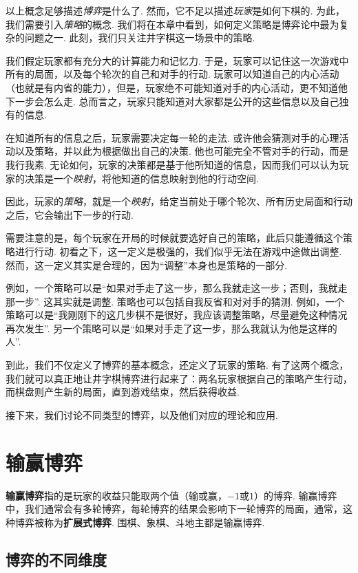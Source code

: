 以上概念足够描述\textit{博弈}是什么了. 然而，它不足以描述\textit{玩家}是如何下棋的. 为此，我们需要引入\textit{策略}的概念. 我们将在本章中看到，如何定义策略是博弈论中最为复杂的问题之一. 此刻，我们只关注井字棋这一场景中的策略.

我们假定玩家都有充分大的计算能力和记忆力. 于是，玩家可以记住这一次游戏中所有的局面，以及每个轮次的自己和对手的行动. 玩家可以知道自己的内心活动（也就是有内省的能力），但是，玩家绝不可能知道对手的内心活动，更不知道他下一步会怎么走. 总而言之，玩家只能知道对大家都是公开的这些信息以及自己独有的信息. 

在知道所有的信息之后，玩家需要决定每一轮的走法. 或许他会猜测对手的心理活动以及策略，并以此为根据做出自己的决策. 他也可能完全不管对手的行动，而是我行我素. 无论如何，玩家的决策都是基于他所知道的信息，因而我们可以认为玩家的决策是一个\textit{映射}，将他知道的信息映射到他的行动空间. 

因此，玩家的\textit{策略}，就是一个\textit{映射}，给定当前处于哪个轮次、所有历史局面和行动之后，它会输出下一步的行动. 

需要注意的是，每个玩家在开局的时候就要选好自己的策略，此后只能遵循这个策略进行行动. 初看之下，这一定义是极强的，我们似乎无法在游戏中途做出调整. 然而，这一定义其实是合理的，因为“调整”本身也是策略的一部分. 

例如，一个策略可以是“如果对手走了这一步，那么我就走这一步；否则，我就走那一步”. 这其实就是调整. 策略也可以包括自我反省和对对手的猜测. 例如，一个策略可以是“我刚刚下的这几步棋不是很好，我应该调整策略，尽量避免这种情况再次发生”. 另一个策略可以是“如果对手走了这一步，那么我就认为他是这样的人”.

到此，我们不仅定义了博弈的基本概念，还定义了玩家的策略. 有了这两个概念，我们就可以真正地让井字棋博弈进行起来了：两名玩家根据自己的策略产生行动，而棋盘则产生新的局面，直到游戏结束，然后获得收益. 

接下来，我们讨论不同类型的博弈，以及他们对应的理论和应用. 

\section{输赢博弈}

\textbf{输赢博弈}指的是玩家的收益只能取两个值（输或赢，$-1$或$1$）的博弈. 输赢博弈中，我们通常会有多轮博弈，每轮博弈的结果会影响下一轮博弈的局面，通常，这种博弈被称为\textbf{扩展式博弈}. 围棋、象棋、斗地主都是输赢博弈. 

\subsection{博弈的不同维度}

